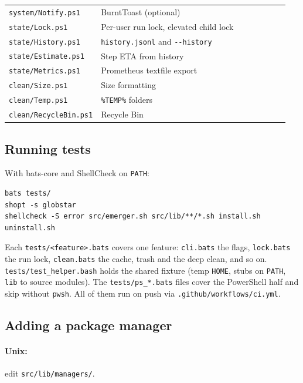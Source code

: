 \documentclass[11pt,a4paper]{article}
\begin{document}
\begin{center}
\begin{tabular}{@{}p{0.25\linewidth} p{0.70\linewidth}@{}}
\texttt{system/Notify.ps1}     & BurntToast (optional) \\
\texttt{state/Lock.ps1}        & Per-user run lock, elevated child lock \\
\texttt{state/History.ps1}     & \texttt{history.jsonl} and \texttt{-{}-history} \\
\texttt{state/Estimate.ps1}    & Step ETA from history \\
\texttt{state/Metrics.ps1}     & Prometheus textfile export \\
\texttt{clean/Size.ps1}        & Size formatting \\
\texttt{clean/Temp.ps1}        & \texttt{\%TEMP\%} folders \\
\texttt{clean/RecycleBin.ps1}  & Recycle Bin \\
\bottomrule
\end{tabular}
\end{center}

\subsection{Running tests}

With bats-core and ShellCheck on \texttt{PATH}:

\begin{lstlisting}[language=bashplus]
bats tests/
shopt -s globstar
shellcheck -S error src/emerger.sh src/lib/**/*.sh install.sh uninstall.sh
\end{lstlisting}

Each \texttt{tests/<feature>.bats} covers one feature: \texttt{cli.bats}
the flags, \texttt{lock.bats} the run lock, \texttt{clean.bats} the cache,
trash and the deep clean, and so on.
\texttt{tests/test\_helper.bash} holds the shared fixture (temp
\texttt{HOME}, stubs on \texttt{PATH}, \texttt{lib} to source modules). The
\texttt{tests/ps\_*.bats} files cover the PowerShell half and skip without
\texttt{pwsh}. All of them run on push via
\texttt{.github/workflows/ci.yml}.

\subsection{Adding a package manager}

\paragraph{Unix:} edit \texttt{src/lib/managers/}.
\end{document}
